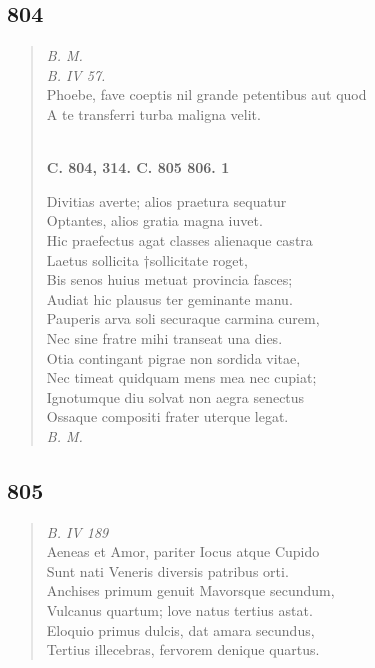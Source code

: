 \documentclass[11pt, a4paper]{report}
\begin{document}
            \subsection*{804}
      \begin{verse}
      \textit{B. M.} \\ \textit{B. IV 57.} \\ Phoebe, fave coeptis nil grande petentibus aut quod \\ A te transferri turba maligna velit. \\ 
        ﻿\pagebreak 
    \begin{center} \textbf{C. 804, 314. C. 805 806. 1} \end{center} \marginpar{[278]} Divitias averte; alios praetura sequatur \\ Optantes, alios gratia magna iuvet. \\ Hic praefectus agat classes alienaque castra \\ Laetus sollicita †sollicitate roget, \\ Bis senos huius metuat provincia fasces; \\ Audiat hic plausus ter geminante manu. \\ Pauperis arva soli securaque \rbrack  carmina curem, \\ Nec sine fratre mihi transeat una dies. \\ Otia contingant pigrae non sordida vitae, \\ Nec timeat quidquam mens mea nec cupiat; \\ Ignotumque diu solvat non aegra senectus \\ Ossaque compositi frater uterque legat. \\ \textit{B. M.} \\ 
      \end{verse}
  
            \subsection*{805}
      \begin{verse}
      \textit{B. IV 189} \\ Aeneas et Amor, pariter Iocus atque Cupido \\ Sunt nati Veneris diversis patribus orti. \\ Anchises primum genuit Mavorsque secundum, \\ Vulcanus quartum; love natus tertius astat. \\ Eloquio primus dulcis, dat amara secundus, \\ Tertius illecebras, fervorem denique quartus. \\ 
      \end{verse}
  
\end{document}
